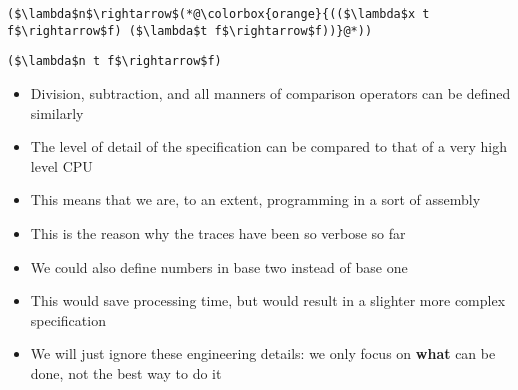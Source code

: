 \documentclass{beamer}
\begin{document}
\begin{frame}[fragile]{\CurrentSection}
\lstset{basicstyle=\ttfamily\small}\lstset{numbers=none}\lstset{language=ML}\begin{lstlisting}
($\lambda$n$\rightarrow$(*@\colorbox{orange}{(($\lambda$x t f$\rightarrow$f) ($\lambda$t f$\rightarrow$f))}@*))
\end{lstlisting}
\pause\lstset{language=ML}\begin{lstlisting}
($\lambda$n t f$\rightarrow$f)
\end{lstlisting}

\end{frame}

\begin{frame}[fragile]{\CurrentSection}
\begin{block}{\CurrentSubSection}
\begin{itemize}
\item Division, subtraction, and all manners of comparison operators can be defined similarly
\item The level of detail of the specification can be compared to that of a very high level CPU
\item This means that we are, to an extent, programming in a sort of assembly
\item This is the reason why the traces have been so verbose so far

\end{itemize}

\end{block}


\end{frame}

\begin{frame}[fragile]{\CurrentSection}
\begin{block}{\CurrentSubSection}
\begin{itemize}
\item We could also define numbers in base two instead of base one
\item This would save processing time, but would result in a slighter more complex specification
\item We will just ignore these engineering details: we only focus on \textbf{what} can be done, not the best way to do it

\end{itemize}

\end{block}


\end{frame}
\end{document}
